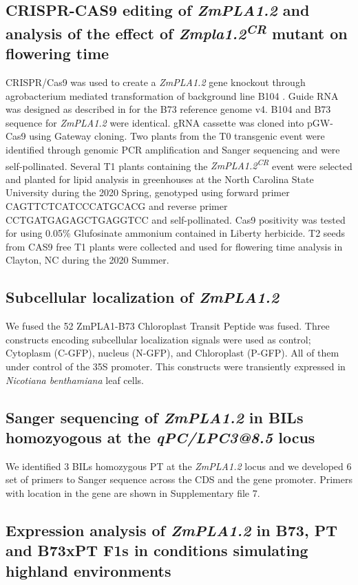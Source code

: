 \documentclass[9pt,twocolumn,twoside]{BioRxiv}
\begin{document}
\subsection{CRISPR-CAS9 editing of \textit{ZmPLA1.2} and analysis of the effect of \textit{Zmpla1.2\textsuperscript{CR}} mutant on flowering time}
CRISPR/Cas9 was used to create a \textit{ZmPLA1.2} gene knockout through agrobacterium mediated transformation of background line B104 \cite{Wu2020-nq, Char2017-uk}. 
Guide RNA was designed as described in \cite{Brazelton2015-co} for the B73 reference genome v4. 
B104 and B73 sequence for \textit{ZmPLA1.2} were identical. 
gRNA cassette was cloned into pGW-Cas9 using Gateway cloning. 
Two plants from the T0 transgenic event were identified through genomic PCR amplification and Sanger sequencing and were self-pollinated. 
Several T1 plants containing the \textit{ZmPLA1.2\textsuperscript{CR}} event were selected and planted for lipid analysis in greenhouses at the North Carolina State University during the 2020 Spring, genotyped using forward primer CAGTTCTCATCCCATGCACG and reverse primer CCTGATGAGAGCTGAGGTCC and  self-pollinated. 
Cas9 positivity was tested for using 0.05\% Glufosinate ammonium contained in Liberty herbicide. 
T2 seeds from CAS9 free T1 plants were collected and used for flowering time analysis in  Clayton, NC during the 2020 Summer. 
\subsection{Subcellular localization of \textit{ZmPLA1.2}}
We fused the 52 ZmPLA1-B73 Chloroplast Transit Peptide was fused. Three constructs encoding subcellular localization signals were used as control; Cytoplasm (C-GFP), nucleus (N-GFP), and Chloroplast (P-GFP). All of them under control of the 35S promoter. This constructs were transiently expressed in \textit{Nicotiana benthamiana} leaf cells.
\subsection{Sanger sequencing of \textit{ZmPLA1.2} in BILs homozyogous at the \textit{qPC/LPC3@8.5} locus}
We identified 3 BILs homozygous PT at the \textit{ZmPLA1.2} locus and we developed 6 set of primers to Sanger sequence across the CDS and the gene promoter. Primers with location in the gene are shown in Supplementary file 7. 

\subsection{Expression analysis of \textit{ZmPLA1.2} in B73, PT and B73xPT F1s in conditions simulating highland environments}
\end{document}
